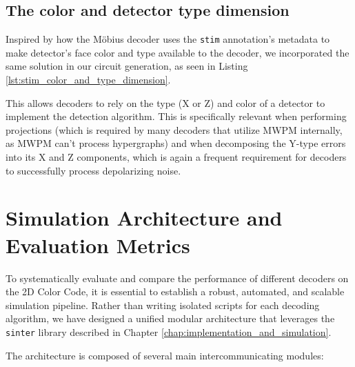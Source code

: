 \subsection{The color and detector type dimension}

Inspired by how the Möbius decoder uses the \texttt{stim} annotation's metadata to make detector's face color and type available to the decoder, we incorporated the same solution in our circuit generation, as seen in Listing \ref{lst:stim_color_and_type_dimension}.


This allows decoders to rely on the type (X or Z) and color of a detector to implement the detection algorithm. This is specifically relevant when performing projections (which is required by many decoders that utilize MWPM internally, as MWPM can't process hypergraphs) and when decomposing the Y-type errors into its X and Z components, which is again a frequent requirement for decoders to successfully process depolarizing noise.

\section{Simulation Architecture and Evaluation Metrics}
\label{sec:simulation_architecture}

To systematically evaluate and compare the performance of different decoders on the 2D Color Code, it is essential to establish a robust, automated, and scalable simulation pipeline. Rather than writing isolated scripts for each decoding algorithm, we have designed a unified modular architecture that leverages the \texttt{sinter} library described in Chapter \ref{chap:implementation_and_simulation}.

The architecture is composed of several main intercommunicating modules:

